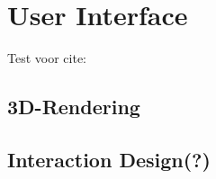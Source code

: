 \section{User Interface}
Test voor cite: \cite{web:UDPSend}
\subsection{3D-Rendering}
\subsection{Interaction Design(?)}